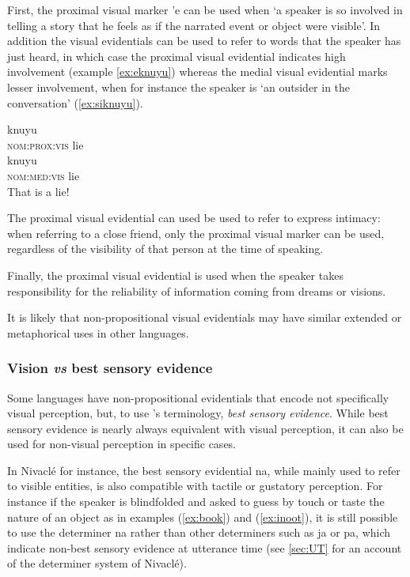 \documentclass[oneside,a4paper,11pt]{article}
\newcommand{\ipa}[1]{{\phon \mbox{#1}}} %
\begin{document}
First, the proximal visual marker \ipa{'e} can be used when `a speaker is so involved in telling a story that he feels as if the narrated event or object were visible'. In addition the visual evidentials can be used to refer to words that the speaker has just heard, in which case the proximal visual evidential indicates high involvement (example \ref{ex:eknuyu}) whereas the medial visual evidential marks lesser involvement, when for instance the speaker is `an outsider in the conversation' (\ref{ex:siknuyu}).

\begin{exe}
\ex \label{ex:eknuyu}
\gll \ipa{'e} \ipa{knuyu} \\
\textsc{nom:prox:vis} lie \\
\ex \label{ex:siknuyu}
\gll \ipa{si} \ipa{knuyu} \\
\textsc{nom:med:vis} lie \\
\glt That is a lie!
\end{exe}

The proximal visual evidential can used be used to refer to express intimacy: when referring to a close friend, only the proximal visual marker can be used, regardless of the visibility of that person at the time of speaking.

Finally, the proximal visual evidential is used when the speaker takes responsibility for the reliability of information coming from dreams or visions.

It is likely that non-propositional visual evidentials may have similar extended or metaphorical uses in other languages.

\subsubsection{Vision \textit{vs} best sensory evidence}
Some languages have non-propositional evidentials that encode not specifically visual perception, but, to use \citet{gutierrez11evidentiality}'s terminology, \textit{best sensory evidence}. While best sensory evidence is nearly always equivalent with visual perception, it can also be used for non-visual perception in specific cases. 

In Nivaclé for instance, the best sensory evidential \ipa{na}, while mainly used to refer to visible entities, is also compatible with tactile or gustatory perception. For instance if the speaker is blindfolded and asked to guess by touch or taste the nature of an object as in examples (\ref{ex:book}) and (\ref{ex:inoot}), it is still possible to use the determiner \ipa{na} rather than other determiners such as \ipa{ja} or \ipa{pa}, which indicate non-best sensory evidence at utterance time (see \ref{sec:UT} for an account of the determiner system of Nivaclé).
\end{document}
